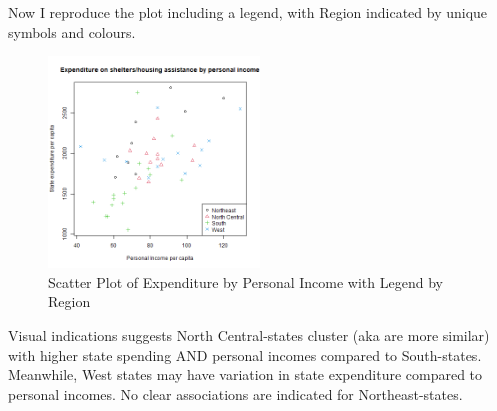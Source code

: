 \documentclass[12pt,letterpaper]{article}
\begin{document}
\begin{itemize}
\noindent Now I reproduce the plot including a legend, with Region indicated by unique symbols and colours.



\begin{figure}[H]
	\centering
	\includegraphics[width=0.5\textwidth]{expenditure_by_personal_income_with_legend.png}
	\caption{Scatter Plot of Expenditure by Personal Income with Legend by Region}
\end{figure}

\noindent Visual indications suggests North Central-states cluster (aka are more similar) with higher state spending AND personal incomes compared to South-states. Meanwhile, West states may have variation in state expenditure compared to personal incomes. No clear associations are indicated for Northeast-states.

\end{itemize}
\end{document}
